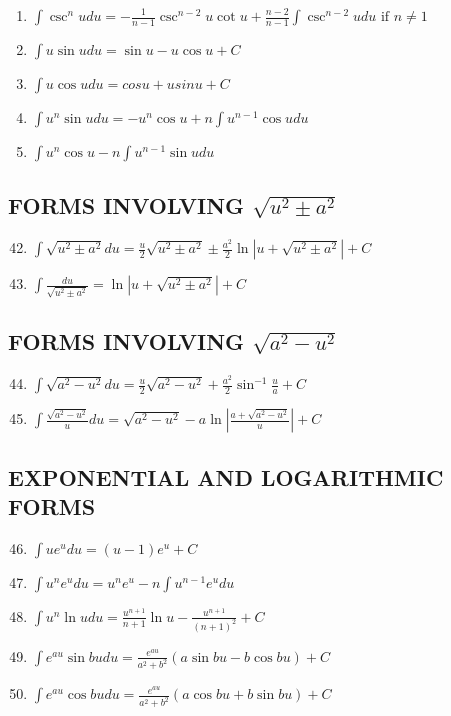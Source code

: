 \documentclass[10pt, letterpaper]{article}
\begin{document}
\begin{enumerate}
	\item $\int \limits \csc ^n u du = - \frac{1}{n-1} \csc ^{n-2} u \cot u + \frac{n-2}{n-1} \int \limits \csc ^{n-2} u du \text{ if } n \neq 1$
	\item $\int \limits u \sin u du = \sin u - u \cos u + C$
	\item $\int \limits u \cos u du = cos u + u sin u + C$
	\item $\int \limits u ^n \sin u du = -u ^n \cos u + n \int \limits u ^{n-1} \cos u du$
	\item $\int \limits u^n \cos u - n \int \limits u ^{n-1} \sin u du$
\end{enumerate}

\subsection{FORMS INVOLVING $\sqrt{u^2 \pm a^2}$ }
\begin{enumerate}
	\setcounter{enumi}{41}
	\item $\int \limits \sqrt{u^2 \pm a^2} du = \frac{u}{2} \sqrt{u^2 \pm a^2} \pm \frac{a^2}{2} \ln | u + \sqrt{u^2 \pm a^2} | + C$
	\item $\int \limits \frac{du}{\sqrt{u^2 \pm a^2}} = \ln | u + \sqrt{u^2 \pm a^2} | + C$
\end{enumerate}

\subsection{FORMS INVOLVING $\sqrt{a^2 - u^2}$}
\begin{enumerate}
	\setcounter{enumi}{43}
	\item $\int \limits \sqrt{a^2 - u^2} du = \frac{u}{2} \sqrt{a^2 - u^2} + \frac{a^2}{2} \sin ^{-1} \frac{u}{a} + C$
	\item $\int \limits \frac{\sqrt{a^2 - u^2}}{u} du = \sqrt{a^2 - u^2} - a \ln | \frac{a + \sqrt{a^2 - u^2}}{u} | + C$
\end{enumerate}

\subsection{EXPONENTIAL AND LOGARITHMIC FORMS}
\begin{enumerate}
	\setcounter{enumi}{45}
	\item $\int \limits u e^u du = (u-1) e^u + C$
	\item $\int \limits u^n e^u du = u^n e^u - n \int \limits u^{n-1} e^u du$
	\item $\int \limits u^n \ln u du = \frac{u^{n+1}}{n+1} \ln u - \frac{u^{n+1}}{(n+1)^2} + C$
	\item $\int \limits e^{au} \sin bu du = \frac{e^{au}}{a^2 + b^2} (a \sin bu - b \cos bu) + C$
	\item $\int \limits e^{au} \cos bu du = \frac{e^{au}}{a^2 + b^2} (a \cos bu + b \sin bu) + C$
\end{enumerate}
\end{document}
